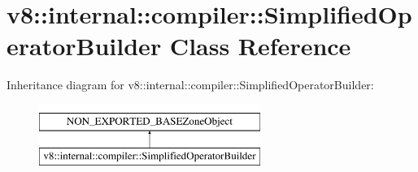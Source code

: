 \hypertarget{classv8_1_1internal_1_1compiler_1_1SimplifiedOperatorBuilder}{}\section{v8\+:\+:internal\+:\+:compiler\+:\+:Simplified\+Operator\+Builder Class Reference}
\label{classv8_1_1internal_1_1compiler_1_1SimplifiedOperatorBuilder}
Inheritance diagram for v8\+:\+:internal\+:\+:compiler\+:\+:Simplified\+Operator\+Builder\+:\begin{figure}[H]
\begin{center}
\leavevmode
\includegraphics[height=2.000000cm]{classv8_1_1internal_1_1compiler_1_1SimplifiedOperatorBuilder}
\end{center}
\end{figure}
